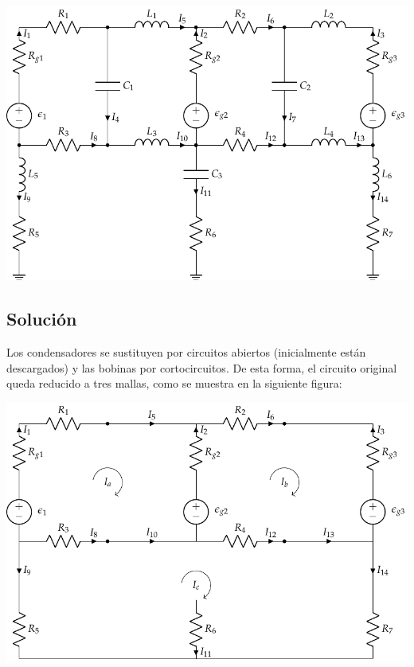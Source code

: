 \begin{center}
  \includegraphics{figuras/mallas_condensadores_bobinas.pdf}
\end{center}


\subsection*{Solución}
Los condensadores se sustituyen por circuitos abiertos (inicialmente
están descargados) y las bobinas por cortocircuitos. De esta forma, el
circuito original queda reducido a tres mallas, como se muestra en la
siguiente figura:

\begin{center}
  \includegraphics{figuras/mallas_condensadores_bobinas_mod.pdf}
\end{center}


